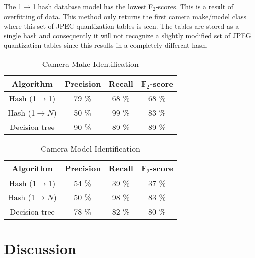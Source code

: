 The 1$\rightarrow$1 hash database model has the lowest F$_2$-scores. This is a result of overfitting of data. This method only returns the first camera make/model class where this set of JPEG quantization tables is seen. The tables are stored as a single hash and consequently it will not recognize a slightly modified set of JPEG quantization tables since this results in a completely different hash.

\begin{table}[h]
\begin{center}

\begin{tabular}{| c| c| c| c|}
\hline
\textbf{Algorithm} & \textbf{Precision} & \textbf{Recall} & \textbf{F$_2$-score}\\
\hline
Hash (1$\rightarrow$1) & 79 \% & 68 \% & 68 \%\\
Hash (1$\rightarrow N$) & 50 \% & 99 \% & 83 \%\\
Decision tree & 90 \% & 89 \% & 89 \% \\
\hline
\end{tabular}
\caption{Camera Make Identification}
\label{tab:fscore_make}
\end{center}

\end{table}

\begin{table}[h]
\begin{center}
\begin{tabular}{| c| c| c| c|}
\hline
\textbf{Algorithm} & \textbf{Precision} & \textbf{Recall} & \textbf{F$_2$-score}\\
\hline
Hash (1$\rightarrow$1) & 54 \% & 39 \% & 37 \%\\
Hash (1$\rightarrow N$) & 50 \% & 98 \% & 83 \%\\
Decision tree & 78 \% & 82 \% & 80 \% \\
\hline
\end{tabular}
\caption{Camera Model Identification}
\label{tab:fscore_model}
\end{center}

\end{table}


\section{Discussion}

